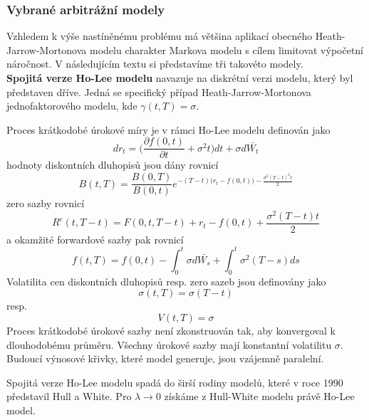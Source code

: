 \documentclass[a4paper]{book}
\begin{document}
\subsubsection{Vybrané arbitrážní modely}

Vzhledem k výše nastíněnému problému má většina aplikací obecného Heath-Jarrow-Mortonova modelu charakter Markova modelu s cílem limitovat výpočetní náročnost. V následujícím textu si představíme tři takovéto modely.\\

\noindent \textbf{Spojitá verze Ho-Lee modelu} navazuje na diskrétní verzi modelu, který byl představen dříve. Jedná se specifický případ Heath-Jarrow-Mortonova jednofaktorového modelu, kde $\gamma(t,T) = \sigma$.

Proces krátkodobé úrokové míry je v rámci Ho-Lee modelu definován jako
\begin{equation*}
d r_t = \Big( \frac{\partial f(0,t)}{\partial t} + \sigma^2 t\Big)dt + \sigma d \bar{W_t}
\end{equation*}
hodnoty diskontních dluhopisů jsou dány rovnicí
\begin{equation*}
B(t,T) = \frac{B(0,T)}{B(0,t)}e^{-(T-t)\big( r_t - f(0,t) \big) - \frac{\sigma^2(T-t)^2t}{2}}
\end{equation*}
zero sazby rovnicí
\begin{equation*}
R^c(t,T-t) = F(0,t,T-t) + r_t - f(0,t) + \frac{\sigma^2(T-t)t}{2}
\end{equation*}
a okamžité forwardové sazby pak rovnicí
\begin{equation*}
f(t,T) = f(0,t) - \int_0^t \sigma d \bar{W_s} + \int_0^t \sigma^2(T-s)ds
\end{equation*}
Volatilita cen diskontních dluhopisů resp. zero sazeb jsou definovány jako
\begin{equation*}
\sigma(t,T) = \sigma (T-t)
\end{equation*}
resp.
\begin{equation*}
V(t,T) = \sigma
\end{equation*}
Proces krátkodobé úrokové sazby není zkonstruován tak, aby konvergoval k dlouhodobému průměru. Všechny úrokové sazby mají konstantní volatilitu $\sigma$. Budoucí výnosové křivky, které model generuje, jsou vzájemně paralelní.

Spojitá verze Ho-Lee modelu spadá do širší rodiny modelů, které v roce 1990 představil Hull a White. Pro $\lambda \rightarrow 0$ získáme z Hull-White modelu právě Ho-Lee model.\\
\end{document}
